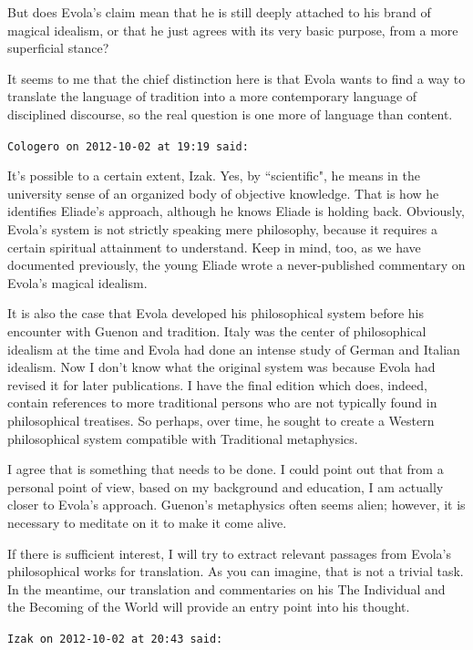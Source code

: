 \begin{footnotesize}
\begin{sffamily}
But does Evola's claim mean that he is still deeply attached to his brand of magical idealism, or that he just agrees with its very basic purpose, from a more superficial stance?

It seems to me that the chief distinction here is that Evola wants to find a way to translate the language of tradition into a more contemporary language of disciplined discourse, so the real question is one more of language than content.


\hfill

\texttt{Cologero on 2012-10-02 at 19:19 said: }

It's possible to a certain extent, Izak. Yes, by ``scientific", he means in the university sense of an organized body of objective knowledge. That is how he identifies Eliade's approach, although he knows Eliade is holding back. Obviously, Evola's system is not strictly speaking mere philosophy, because it requires a certain spiritual attainment to understand. Keep in mind, too, as we have documented previously, the young Eliade wrote a never-published commentary on Evola's magical idealism.

It is also the case that Evola developed his philosophical system before his encounter with Guenon and tradition. Italy was the center of philosophical idealism at the time and Evola had done an intense study of German and Italian idealism. Now I don't know what the original system was because Evola had revised it for later publications. I have the final edition which does, indeed, contain references to more traditional persons who are not typically found in philosophical treatises. So perhaps, over time, he sought to create a Western philosophical system compatible with Traditional metaphysics.

I agree that is something that needs to be done. I could point out that from a personal point of view, based on my background and education, I am actually closer to Evola's approach. Guenon's metaphysics often seems alien; however, it is necessary to meditate on it to make it come alive.

If there is sufficient interest, I will try to extract relevant passages from Evola's philosophical works for translation. As you can imagine, that is not a trivial task. In the meantime, our translation and commentaries on his The Individual and the Becoming of the World will provide an entry point into his thought.


\hfill

\texttt{Izak on 2012-10-02 at 20:43 said: }


\end{sffamily}
\end{footnotesize}
